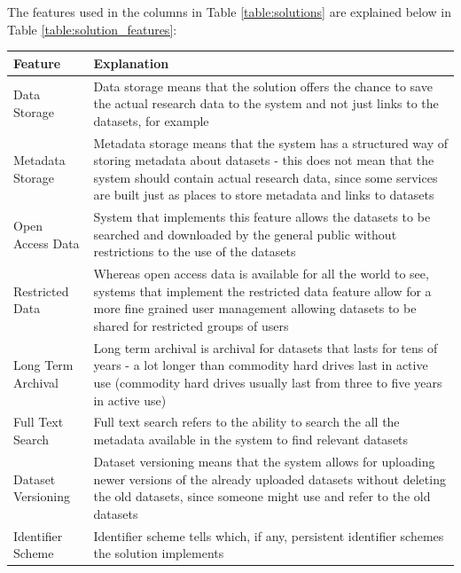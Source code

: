 The features used in the columns in Table \ref{table:solutions} are explained
below in Table \ref{table:solution_features}:


\label{table:solution_features}
    \begin{tabularx}{\textwidth}{| >{\raggedright}p{3cm} | X |}
    \hline
    \textbf{Feature} & \textbf{Explanation} \\
    \hline
    \rowcolor{Gray}
    Data Storage    & Data storage means that the solution offers the chance to
                      save the actual research data to the system and not just links
                      to the datasets, for example\\
    \hline
    Metadata Storage &  Metadata storage means that the system has a structured way
                        of storing metadata about datasets - this does not mean that
                        the system should contain actual research data, since some services
                        are built just as places to store metadata and links to datasets\\
    \hline
    \rowcolor{Gray}
    Open Access Data    & System that implements this feature allows the datasets to be searched
                          and downloaded by the general public without restrictions to the use
                          of the datasets\\
    \hline
    Restricted Data    & Whereas open access data is available for all the world to see, systems
                         that implement the restricted data feature allow for a more fine grained
                         user management allowing datasets to be shared for restricted groups
                         of users\\
    \hline
    \rowcolor{Gray}
    Long Term Archival    & Long term archival is archival for datasets that lasts for tens of years -
                            a lot longer than commodity hard drives last in active use (commodity
                            hard drives usually last from three to five years in active use)\\
    \hline
    Full Text Search    & Full text search refers to the ability to search the all the metadata
                          available in the system to find relevant datasets\\
    \hline
    \rowcolor{Gray}
    Dataset Versioning    & Dataset versioning means that the system allows for uploading newer versions
                           of the already uploaded datasets without deleting the old datasets, since
                           someone might use and refer to the old datasets\\
    \hline
    Identifier Scheme    & Identifier scheme tells which, if any, persistent identifier schemes the
                           solution implements\\
    \hline
\end{tabularx}

